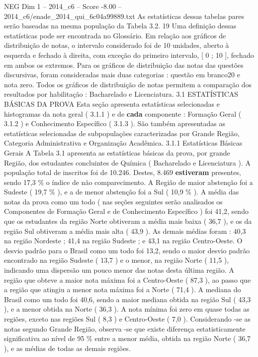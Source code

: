 \begin{textsample}{NEG Dim 1 – 2014\_c6 – Score -8.00 – 2014\_c6/enade\_2014\_qui\_6c04a99889.txt}
As estatísticas dessas tabelas pares serão baseadas na mesma população da Tabela 3.2. 19 Uma definição dessas estatísticas pode ser encontrada no Glossário.
Em relação aos gráficos de distribuição de notas, o intervalo considerado foi de 10 unidades, aberto à esquerda e fechado à direita, com exceção do primeiro intervalo, [ 0 ; 10 ], fechado em ambos os extremos.
Para os gráficos de distribuição das notas das questões discursivas, foram consideradas mais duas categorias : questão em branco20 e nota zero.
Todos os gráficos de distribuição de notas permitem a comparação dos resultados por habilitação : Bacharelado e Licenciatura. 3.1 ESTATÍSTICAS BÁSICAS DA PROVA Esta seção apresenta estatísticas selecionadas e histogramas da nota geral ( 3.1.1 ) e de \textbf{cada} componente : Formação Geral ( 3.1.2 ) e Conhecimento Específico ( 3.1.3 ).
São também apresentadas as estatísticas selecionadas de subpopulações caracterizadas por Grande Região, Categoria Administrativa e Organização Acadêmica. 3.1.1 Estatísticas Básicas Gerais A Tabela 3.1 apresenta as estatísticas básicas da prova, por grande Região, dos estudantes concluintes de Química ( Bacharelado e Licenciatura ).
A população total de inscritos foi de 10.246.
Destes, 8.469 \textbf{estiveram} presentes, sendo 17,3 \% o índice de não comparecimento.
A Região de maior abstenção foi a Sudeste ( 19,7 \% ), e a de menor abstenção foi a Sul ( 10,9 \% ).
A média das notas da prova como um todo ( nas seções seguintes serão analisados os Componentes de Formação Geral e de Conhecimento Específico ) foi 41,2, sendo que os estudantes da região Norte obtiveram a média mais baixa ( 36,7 ), e os da região Sul obtiveram a média mais alta ( 43,9 ).
As demais médias foram : 40,3 na região Nordeste ; 41,4 na região Sudeste ; e 43,1 na região Centro-Oeste.
O desvio padrão para o Brasil como um todo foi 13,2, sendo o maior desvio padrão encontrado na região Sudeste ( 13,7 ) e o menor, na região Norte ( 11,5 ), indicando uma dispersão um pouco menor das notas desta última região.
A região que obteve a maior nota máxima foi a Centro-Oeste ( 87,3 ), ao passo que a região que atingiu a menor nota máxima foi a Norte ( 71,4 ).
A mediana do Brasil como um todo foi 40,6, sendo a maior mediana obtida na região Sul ( 43,3 ), e a menor obtida na Norte ( 36,3 ).
A nota mínima foi zero em quase todas as regiões, exceto nas regiões Sul ( 8,3 ) e Centro-Oeste ( 7,0 ).
Considerando -se as notas segundo Grande Região, observa -se que existe diferença estatisticamente significativa ao nível de 95 \% entre a menor média, obtida na região Norte ( 36,7 ), e as médias de todas as demais regiões.

\end{textsample}
